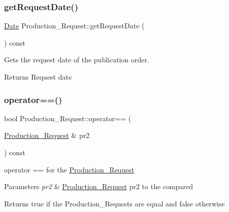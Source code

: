 \subsubsection{\texorpdfstring{get\+Request\+Date()}{getRequestDate()}}
{\footnotesize\ttfamily \hyperlink{class_date}{Date} Production\+\_\+\+Request\+::get\+Request\+Date (\begin{DoxyParamCaption}{ }\end{DoxyParamCaption}) const}



Gets the request date of the publication order. 

\begin{DoxyReturn}{Returns}
Request date 
\end{DoxyReturn}
\mbox{\label{class_production___request_a37fd21082c7c874be9587e8d3cce7174}} 
\subsubsection{\texorpdfstring{operator==()}{operator==()}}
{\footnotesize\ttfamily bool Production\+\_\+\+Request\+::operator== (\begin{DoxyParamCaption}\item[{\hyperlink{class_production___request}{Production\+\_\+\+Request} \&}]{pr2 }\end{DoxyParamCaption}) const}



operator == for the \hyperlink{class_production___request}{Production\+\_\+\+Request} 


\begin{DoxyParams}{Parameters}
{\em pr2} & \hyperlink{class_production___request}{Production\+\_\+\+Request} pr2 to the compared\\
\hline
\end{DoxyParams}
\begin{DoxyReturn}{Returns}
true if the Production\+\_\+\+Requests are equal and false otherwise 
\end{DoxyReturn}
\mbox{\label{class_production___request_ab08bac86aa95f28f06bf17685f7164aa}} 

